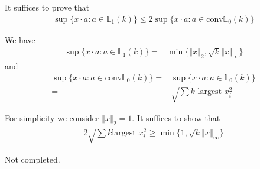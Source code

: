 \documentclass[11pt,a4paper]{ctexart}
\numberwithin{equation}{section}%
\begin{document}
\subsection{}
It suffices to prove that 
\begin{align*}
    \sup\{x\cdot a:a\in \mathbb{L}_1(k)\}\leq 2\sup\{x\cdot a:a\in \mathrm{conv} \mathbb{L}_0(k)\} 
\end{align*}

We have
\begin{align*}
    \sup\{x\cdot a:a\in \mathbb{L}_1(k)\}= & \min\{ \left\Vert x \right\Vert _2, \sqrt{k}\left\Vert x \right\Vert _\infty \}
\end{align*}
and 
\begin{align*}
    \sup\{x\cdot a:a\in \mathrm{conv}\mathbb{L}_0(k)\} =& \sup\{x\cdot a:a\in\mathbb{L}_0(k)\}\\
    =& \sqrt{\sum k \text{ largest } x_i^2}
\end{align*}

For simplicity we consider $ \left\Vert x \right\Vert _2 =1 $. It suffices to show that
\begin{align*}
     2\sqrt{\sum k \text{largest } x_i^2} \geq \min \{1, \sqrt{k}\left\Vert x \right\Vert _\infty \}
\end{align*}

{\color{red}Not completed.}








    
































    


    
    
\end{document}
